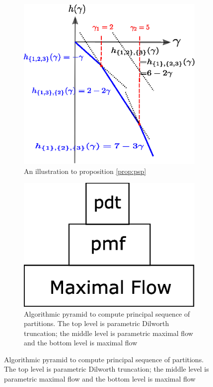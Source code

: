 \documentclass{article}
\begin{document}
\begin{figure}
\centering
\begin{subfigure}{0.45\textwidth}
\includegraphics[width=\textwidth]{pic/dt.eps}
\caption{An illustration to proposition \ref{prop:psp}}\label{fig:psp}
\end{subfigure}
\begin{subfigure}{0.45\textwidth}
\includegraphics[width=\textwidth]{pic/pdt.eps}
\caption{Algorithmic pyramid to compute principal sequence of partitions. The top level is parametric Dilworth truncation; the middle level is parametric maximal flow and the bottom level is maximal flow}\label{fig:pyramid}
\end{subfigure}
\end{figure}
\end{document}
